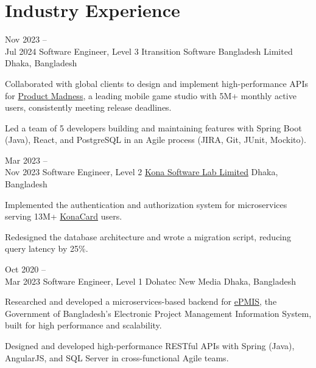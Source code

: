 \documentclass{academic-cv}
\begin{document}
\section{Industry Experience}
\begin{cvlist}
    \cventry
        {Nov 2023 --\\ Jul 2024}
        {Software Engineer, Level 3}
        {Itransition Software Bangladesh Limited}
        {Dhaka, Bangladesh}
        \begin{cvbullets}
            \item Collaborated with global clients to design and implement high-performance APIs for \href{https://www.productmadness.com/}{Product Madness}, a leading mobile game studio with 5M+ monthly active users, consistently meeting release deadlines.
            \item Led a team of 5 developers building and maintaining features with Spring Boot (Java), React, and PostgreSQL in an Agile process (JIRA, Git, JUnit, Mockito).
        \end{cvbullets}

    \cventry
        {Mar 2023 --\\ Nov 2023}
        {Software Engineer, Level 2}
        {\href{https://www.konasl.com/}{Kona Software Lab Limited}}
        {Dhaka, Bangladesh}
        \begin{cvbullets}
            \item Implemented the authentication and authorization system for microservices serving 13M+ \href{https://www.konacard.co.kr/}{KonaCard} users.
            \item Redesigned the database architecture and wrote a migration script, reducing query latency by 25\%.
        \end{cvbullets}

    \cventry
        {Oct 2020 --\\ Mar 2023}
        {Software Engineer, Level 1}
        {Dohatec New Media}
        {Dhaka, Bangladesh}
        \begin{cvbullets}
            \item Researched and developed a microservices-based backend for \href{https://epmis.gov.bd/}{ePMIS}, the Government of Bangladesh's Electronic Project Management Information System, built for high performance and scalability.
            \item Designed and developed high-performance RESTful APIs with Spring (Java), AngularJS, and SQL Server in cross-functional Agile teams.
        \end{cvbullets}


\end{cvlist}
\end{document}
